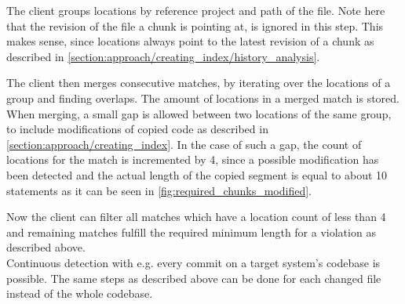 The client groups locations by reference project and path of the file.
Note here that the revision of the file a chunk is pointing at, is ignored in this step.
This makes sense, since locations always point to the latest revision of a chunk as described in \autoref{section:approach/creating_index/history_analysis}.

The client then merges consecutive matches, by iterating over the locations of a group and finding overlaps.
The amount of locations in a merged match is stored.
When merging, a small gap is allowed between two locations of the same group, to include modifications of copied code as described in \autoref{section:approach/creating_index}.
In the case of such a gap, the count of locations for the match is incremented by 4, since a possible modification has been detected and the actual length of the copied segment is equal to about 10 statements as it can be seen in \autoref{fig:required_chunks_modified}.

Now the client can filter all matches which have a location count of less than 4 and remaining matches fulfill the required minimum length for a violation as described above.
\\
Continuous detection with e.g. every commit on a target system's codebase is possible.
The same steps as described above can be done for each changed file instead of the whole codebase.
